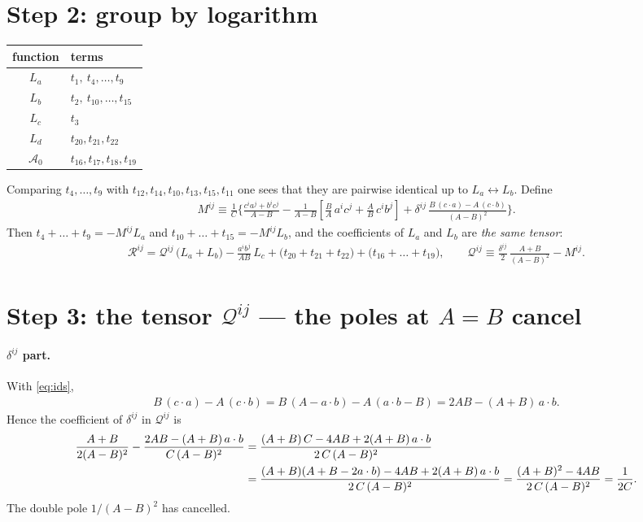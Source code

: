 \documentclass[10pt]{article}
\numberwithin{equation}{section}
\begin{document}
\section{Step 2: group by logarithm}

\begin{center}
\renewcommand{\arraystretch}{1.3}
\begin{tabular}{c|l}
function & terms\\ \hline
$L_{a}$ & $t_{1},\ t_{4},\dots,t_{9}$\\
$L_{b}$ & $t_{2},\ t_{10},\dots,t_{15}$\\
$L_{c}$ & $t_{3}$\\
$L_{d}$ & $t_{20},t_{21},t_{22}$\\
$\mathcal{A}_{0}$ & $t_{16},t_{17},t_{18},t_{19}$
\end{tabular}
\end{center}
Comparing $t_{4},\dots,t_{9}$ with $t_{12},t_{14},t_{10},t_{13},t_{15},t_{11}$ one sees that they are pairwise identical up to $L_{a}\leftrightarrow L_{b}$. Define
\begin{align}
M^{ij}\equiv\frac{1}{C}\Bigg\{\frac{c^{i}a^{j}+b^{i}c^{j}}{A-B}-\frac{1}{A-B}\left[\frac{B}{A}\,a^{i}c^{j}+\frac{A}{B}\,c^{i}b^{j}\right]
+\delta^{ij}\,\frac{B\,(c\cdot a)-A\,(c\cdot b)}{(A-B)^{2}}\Bigg\}. \label{eq:M}
\end{align}
Then $t_{4}+\dots+t_{9}=-M^{ij}L_{a}$ and $t_{10}+\dots+t_{15}=-M^{ij}L_{b}$, and the coefficients of $L_{a}$ and $L_{b}$ are \emph{the same tensor}:
\begin{align}
\mathcal{R}^{ij}=\mathcal{Q}^{ij}\,\big(L_{a}+L_{b}\big)-\frac{a^{i}b^{j}}{AB}\,L_{c}+\big(t_{20}+t_{21}+t_{22}\big)+\big(t_{16}+\dots+t_{19}\big),\qquad
\mathcal{Q}^{ij}\equiv\frac{\delta^{ij}}{2}\,\frac{A+B}{(A-B)^{2}}-M^{ij}. \label{eq:grouped}
\end{align}

\section{Step 3: the tensor $\mathcal{Q}^{ij}$ --- the poles at $A=B$ cancel}

\paragraph{$\delta^{ij}$ part.} With \eqref{eq:ids},
\begin{align}
B\,(c\cdot a)-A\,(c\cdot b)=B\,(A-a\cdot b)-A\,(a\cdot b-B)=2AB-(A+B)\,a\cdot b .
\end{align}
Hence the coefficient of $\delta^{ij}$ in $\mathcal{Q}^{ij}$ is
\begin{align}
\frac{A+B}{2(A-B)^{2}}-\frac{2AB-(A+B)\,a\cdot b}{C\,(A-B)^{2}}
&=\frac{(A+B)\,C-4AB+2(A+B)\,a\cdot b}{2\,C\,(A-B)^{2}}\notag\\
&=\frac{(A+B)(A+B-2a\cdot b)-4AB+2(A+B)\,a\cdot b}{2\,C\,(A-B)^{2}}
=\frac{(A+B)^{2}-4AB}{2\,C\,(A-B)^{2}}=\frac{1}{2C}.
\end{align}
The double pole $1/(A-B)^{2}$ has cancelled.
\end{document}
